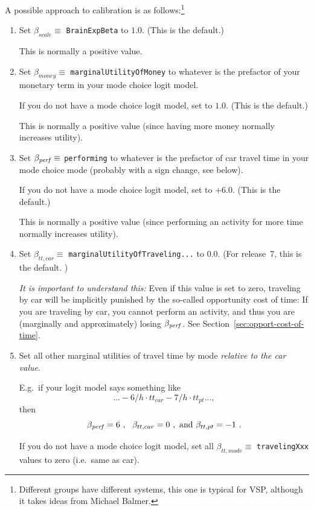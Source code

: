 A possible approach to calibration is as follows:\footnote{%
%
Different groups have different systems, this one is typical for VSP, although it takes ideas from Michael Balmer.
%
}
\begin{enumerate}

\item Set $\beta_{scale} \equiv$ \verb$BrainExpBeta$ to $1.0$.  (This is the default.) 

This is normally a positive value.

\item Set $\beta_{money} \equiv$ \verb$marginalUtilityOfMoney$ to whatever is the prefactor of your monetary term in your mode choice logit model.

If you do not have a mode choice logit model, set to $1.0$.  (This is the default.)

This is normally a positive value (since having more money normally increases utility).

\item Set $\beta_{\it perf} \equiv$ \verb$performing$ to whatever is the prefactor of car travel time in your mode choice mode (probably with a sign change, see below).

If you do not have a mode choice logit model, set to $+6.0$.  (This is the default.)

This is normally a positive value (since performing an activity for more time normally increases utility).

\item Set $\beta_{tt,car} \equiv$ \verb$marginalUtilityOfTraveling...$ to $0.0$. (For release~7, this is the default. )

\emph{It is important to understand this:}  Even if this value is set to zero, traveling by car will be implicitly punished by the so-called opportunity cost of time: If you are traveling by car, you cannot perform an activity, and thus you are (marginally and approximately) losing $\beta_{\it perf}$.  See Section~\ref{sec:opport-cost-of-time}.

\item Set all other marginal utilities of travel time by mode \emph{relative to the car value}.

E.g.\ if your logit model says something like 
\[
... -6/h \cdot tt_{car} - 7/h \cdot tt_{pt} ... ,
\]
then 
\[
\beta_{\it perf} = 6 \ , \ \ \beta_{tt,car} = 0 \ , \hbox{ and } \beta_{tt,pt} = -1 \ .
\]

If you do not have a mode choice logit model, set all $\beta_{tt,mode} \equiv$ \verb$travelingXxx$ values to zero (i.e.\ same as car).


\end{enumerate}
